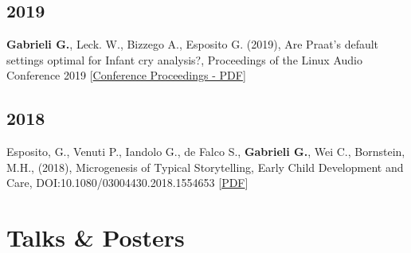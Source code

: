 \documentclass[a4paper]{deedy-resume} %
\begin{document}
\begin{minipage}[t]{0.63\textwidth}
\begin{tightitemize}
	    \subsection{2019}
	        \item \textbf{Gabrieli G.}, Leck. W., Bizzego A., Esposito G. (2019), Are Praat's default settings optimal for Infant cry analysis?, Proceedings of the Linux Audio Conference 2019    [\href{http://lac.linuxaudio.org/2019/doc/gabrieli.pdf}{Conference Proceedings - PDF}]
	    \sectionspace
	    \subsection{2018}
	        \item  Esposito, G., Venuti P., Iandolo G., de Falco S., \textbf{Gabrieli G.}, Wei C., Bornstein, M.H.,  (2018), Microgenesis of Typical Storytelling, Early Child Development and Care, DOI:10.1080/03004430.2018.1554653 
	        [\href{https://www.tandfonline.com/doi/full/10.1080/03004430.2018.1554653}{PDF}]
	    
		\end{tightitemize}
		\sectionspace
	
	\section{Talks \& Posters}
	

\end{minipage}
\end{document}
